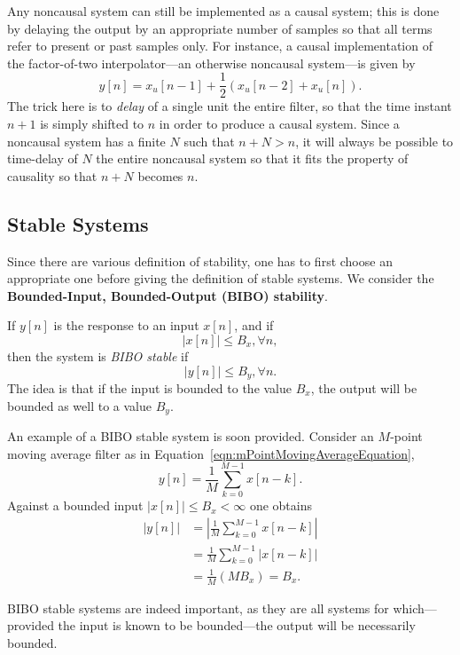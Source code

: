 \documentclass[\documentfontsize, twocolumn]{\classname}
\begin{document}
Any noncausal system can still be implemented as a causal system; this is done by delaying the output by an appropriate number of samples so that all terms refer to present or past samples only. For instance, a causal implementation of the factor-of-two interpolator---an otherwise noncausal system---is given by
\begin{equation}\label{eqn:causalLinearInterpolationFactorTwo}
    y[n] = x_u[n-1] + \frac 1 2(x_u[n-2] + x_u[n]).
\end{equation}
The trick here is to \emph{delay} of a single unit the entire filter, so that the time instant $n+1$ is simply shifted to $n$ in order to produce a causal system. Since a noncausal system has a finite $N$ such that $n+N > n$, it will always be possible to time-delay of $N$ the entire noncausal system so that it fits the property of causality so that $n + N$ becomes $n$.

\subsection{Stable Systems}\label{sec:BIBOStableSystems}

Since there are various definition of stability, one has to first choose an appropriate one before giving the definition of stable systems. We consider the \textbf{Bounded-Input, Bounded-Output (BIBO) stability}.

If $y[n]$ is the response to an input $x[n]$, and if \[|x[n]| \leq B_x, \forall n,\] then the system is \emph{BIBO stable} if \[|y[n]| \leq B_y,\forall n.\] The idea is that if the input is bounded to the value $B_x$, the output will be bounded as well to a value $B_y$.

An example of a BIBO stable system is soon provided. Consider an $M$-point moving average filter as in Equation~\ref{eqn:mPointMovingAverageEquation},
\[
    y[n] = \frac 1 M \sum_{k=0}^{M-1} x[n-k].
\]
Against a bounded input $|x[n]| \leq B_x < \infty$ one obtains
\begin{align*}
    |y[n]| &= \left| \frac 1 M \sum_{k=0}^{M-1} x[n-k]\right|\\
           &= \frac 1 M \sum_{k=0}^{M-1} \left| x[n-k]\right|\\
           &= \frac 1 M (MB_x) = B_x.
\end{align*}

BIBO stable systems are indeed important, as they are all systems for which---provided the input is known to be bounded---the output will be necessarily bounded.
\end{document}
